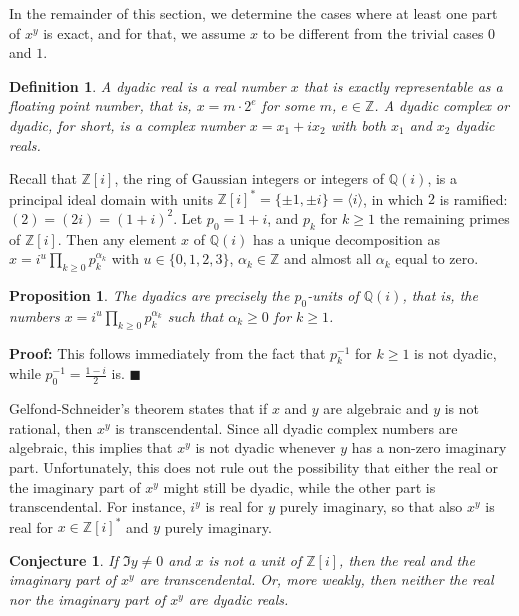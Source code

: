 \documentclass [11pt]{article}
\newcommand {\Z}{\mathbb Z}
\newcommand {\Q}{\mathbb Q}
\renewcommand {\geq}{\geqslant}
\newtheorem{definition}[theorem]{Definition}
\newtheorem{prop}[theorem]{Proposition}
\newtheorem{conj}[theorem]{Conjecture}
\newenvironment{proof}{\noindent \textbf {Proof:}}{{\hspace* {\fill}$\blacksquare$}}
\begin{document}
In the remainder of this section, we determine the cases where at
least one part of $x^y$ is exact, and for that, we assume $x$ to be
different from the trivial cases $0$ and $1$.

\begin {definition}
A {\em dyadic real} is a real number $x$ that is exactly representable
as a floating point number, that is, $x = m \cdot 2^e$ for some $m$, $e \in \Z$.
A {\em dyadic complex} or {\em dyadic}, for short, is a complex number
$x = x_1 + i x_2$ with both $x_1$ and $x_2$ dyadic reals.
\end {definition}

Recall that $\Z [i]$, the ring of Gaussian integers or integers of $\Q (i)$,
is a principal ideal domain with units
$\Z [i]^\ast = \{ \pm 1, \pm i \} = \langle i \rangle$,
in which $2$ is ramified: $(2) = (2 i) = (1 + i)^2$. Let $p_0 = 1 + i$, and
$p_k$ for $k \geq 1$ the remaining primes of $\Z [i]$. Then any element
$x$ of $\Q (i)$ has a unique decomposition as
$x = i^u \prod_{k \geq 0} p_k^{\alpha_k}$ with $u \in \{ 0, 1, 2, 3\}$,
$\alpha_k \in \Z$ and almost all $\alpha_k$ equal to zero.

\begin {prop}
\label {prop:dyadic}
The dyadics are precisely the $p_0$-units of $\Q (i)$, that is,
the numbers $x = i^u \prod_{k \geq 0} p_k^{\alpha_k}$
such that $\alpha_k \geq 0$ for $k \geq 1$.
\end {prop}

\begin {proof}
This follows immediately from the fact that $p_k^{-1}$ for $k \geq 1$ is not
dyadic, while $p_0^{-1} = \frac {1 - i}{2}$ is.
\end {proof}

Gelfond-Schneider's theorem states that if $x$ and $y$ are algebraic and
$y$ is not rational, then $x^y$ is transcendental.
Since all dyadic complex numbers are algebraic, this implies that $x^y$ is
not dyadic whenever $y$ has a non-zero imaginary part.
Unfortunately, this does not rule out the possibility that
either the real or the imaginary part of $x^y$ might still be dyadic,
while the other part is transcendental.
For instance, $i^y$ is real for $y$ purely imaginary, so that
also $x^y$ is real for $x \in \Z [i]^\ast$ and $y$ purely imaginary.

\begin {conj}
\label{conj}
If $\Im y \neq 0$ and $x$ is not a unit of $\Z [i]$, then
the real and the imaginary part of $x^y$ are transcendental.
Or, more weakly, then neither the real nor the imaginary
part of $x^y$ are dyadic reals.
\end {conj}
\end{document}
